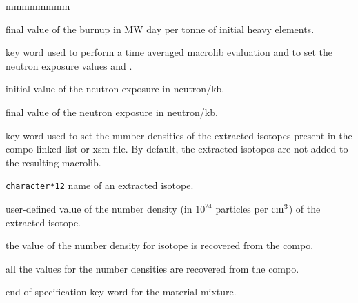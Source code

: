 \begin{ListeDeDescription}{mmmmmmmm}
\item[\dusa{burn1}] final value of the burnup in MW day per tonne of initial heavy elements.

\item[\moc{T-N/KB}] key word used to perform a time averaged {\sc macrolib} evaluation and to set the neutron exposure values  and .

\item[\dusa{xnkb0}] initial value of the neutron exposure in neutron/kb.

\item[\dusa{xnkb1}] final value of the neutron exposure in neutron/kb.

\item[\moc{MICRO}] key word used to set the number densities of the extracted isotopes present in the {\sc compo} linked list or {\sc xsm} file. By default, the extracted isotopes are not added to the resulting {\sc macrolib}.

\item[\dusa{HISO}] {\tt character*12} name of an extracted isotope.

\item[\dusa{conc}] user-defined value of the number density (in $10^{24}$ particles per ${\rm cm}^3$) of the extracted isotope.

\item[\moc{*}] the value of the number density for isotope  is recovered from the {\sc compo}.

\item[\moc{ALL}] all the values for the number densities are recovered from the {\sc compo}.

\item[\moc{ENDMIX}] end of specification key word for the material mixture.

\end{ListeDeDescription}

\eject
